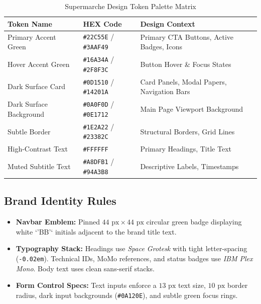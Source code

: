 \documentclass[11pt,a4paper]{article}
\begin{document}
\begin{table}[h!]
\centering
\caption{Supermarche Design Token Palette Matrix}
\begin{tabular}{lll}
\toprule
\textbf{Token Name} & \textbf{HEX Code} & \textbf{Design Context} \\
\midrule
Primary Accent Green & \texttt{\#22C55E} / \texttt{\#3AAF49} & Primary CTA Buttons, Active Badges, Icons \\
Hover Accent Green   & \texttt{\#16A34A} / \texttt{\#2F8F3C} & Button Hover \& Focus States \\
Dark Surface Card    & \texttt{\#0D1510} / \texttt{\#14201A} & Card Panels, Modal Papers, Navigation Bars \\
Dark Surface Background & \texttt{\#0A0F0D} / \texttt{\#0E1712} & Main Page Viewport Background \\
Subtle Border        & \texttt{\#1E2A22} / \texttt{\#23382C} & Structural Borders, Grid Lines \\
High-Contrast Text   & \texttt{\#FFFFFF}             & Primary Headings, Title Text \\
Muted Subtitle Text  & \texttt{\#A8DFB1} / \texttt{\#94A3B8} & Descriptive Labels, Timestamps \\
\bottomrule
\end{tabular}
\end{table}

\subsection{Brand Identity Rules}
\begin{itemize}
    \item \textbf{Navbar Emblem:} Pinned $44\text{ px} \times 44\text{ px}$ circular green badge displaying white `'BB'` initials adjacent to the brand title text.
    \item \textbf{Typography Stack:} Headings use \textit{Space Grotesk} with tight letter-spacing (\texttt{-0.02em}). Technical IDs, MoMo references, and status badges use \textit{IBM Plex Mono}. Body text uses clean sans-serif stacks.
    \item \textbf{Form Control Specs:} Text inputs enforce a $13\text{ px}$ text size, $10\text{ px}$ border radius, dark input backgrounds (\texttt{\#0A120E}), and subtle green focus rings.
\end{itemize}

\newpage

\end{document}

